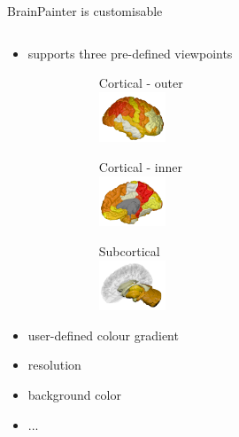 \documentclass[10pt,xcolor=table,aspectratio=169]{beamer}
\begin{document}
\begin{frame}[t]{BrainPainter is customisable}
\begin{columns}[t]
\begin{column}{0.5\textwidth}
 \begin{itemize}
   \item supports three pre-defined viewpoints
      \begin{figure}
    \fontsize{8}{10}\selectfont
     \begin{subfigure}{0.25\textwidth}
      \centering
      Cortical - outer\\
      \includegraphics[height=1.5cm]{images/DK_output/Image_2_cortical-outer.png}
     \end{subfigure}
     \begin{subfigure}{0.25\textwidth}
      \centering
      Cortical - inner\\
      \includegraphics[height=1.5cm]{images/DK_output/Image_2_cortical-inner.png}
     \end{subfigure}
     \begin{subfigure}{0.25\textwidth}
      \centering
      Subcortical\\
      \includegraphics[height=1.5cm]{images/DK_output/Image_2_subcortical.png}
     \end{subfigure}

   \end{figure}
   
   \vspace{2em}
   
      
   
   \item user-defined colour gradient
   \item resolution
   \item background color
   \item ...
   
   

  \end{itemize}



\end{column}
\end{columns}

  

\end{frame}
 
\end{document}
